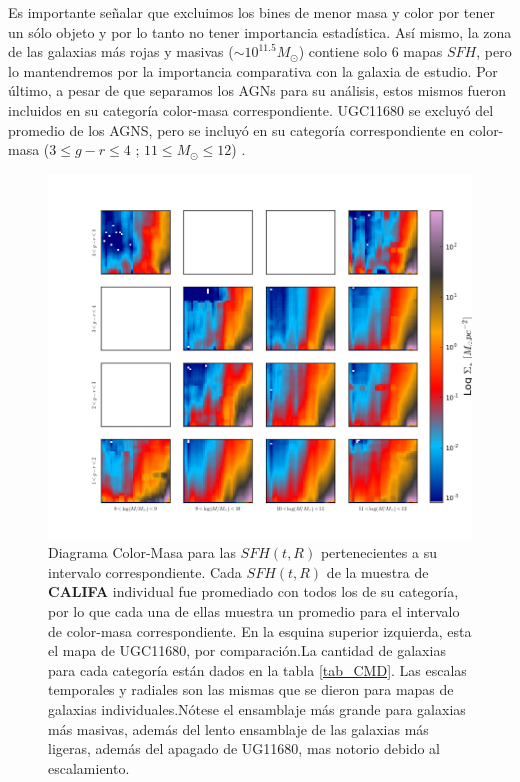 \bigskip



\noindent Es importante señalar que excluimos los bines de menor masa y color por tener un sólo objeto y por lo tanto no tener importancia estadística. Así mismo, la zona de las galaxias más rojas y masivas ($\sim 10^{11.5} M_{\odot}$) contiene solo 6 mapas $SFH$, pero lo mantendremos por la importancia comparativa  con la galaxia de estudio. Por último, a pesar de que separamos los AGNs para su análisis, estos mismos fueron incluidos en su categoría color-masa correspondiente. UGC11680 se excluyó del promedio de los AGNS, pero se incluyó en su categoría correspondiente en color-masa ($3 \le g-r \le 4$ ; $11 \le M_{\odot} \le 12$)
.

\begin{figure}
  \centering
    \includegraphics[scale=0.6]{cmd_sfh.png}
  \caption[Diagrama Color-Masa para la muestra de CALIFA]{Diagrama Color-Masa  para las $SFH(t,R)$ pertenecientes a su intervalo correspondiente.
           Cada $SFH(t,R)$ de la muestra de  \textbf{CALIFA} individual fue promediado con todos los de su categoría,
           por lo que cada una de ellas muestra un promedio para el intervalo de color-masa correspondiente. En la esquina superior izquierda, esta el mapa de UGC11680, por comparación.La cantidad de galaxias para cada categoría están dados en la tabla \ref{tab_CMD}. Las escalas temporales y radiales son las mismas que se dieron para mapas de galaxias individuales.Nótese el ensamblaje más grande para galaxias más masivas, además del lento ensamblaje de las galaxias más ligeras, además del apagado de UG11680, mas notorio debido al escalamiento.}
  \label{CMD}
\end{figure}



